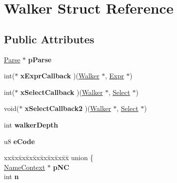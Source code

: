 \hypertarget{struct_walker}{}\section{Walker Struct Reference}
\label{struct_walker}
\subsection*{Public Attributes}
\begin{DoxyCompactItemize}
\item 
\mbox{\label{struct_walker_ac6e8e756b5da8f187b9cf6b94560f352}} 
\mbox{\hyperlink{struct_parse}{Parse}} $\ast$ {\bfseries p\+Parse}
\item 
\mbox{\label{struct_walker_a46cbdf0ccdcf736096a2f168218d28fe}} 
int($\ast$ {\bfseries x\+Expr\+Callback} )(\mbox{\hyperlink{struct_walker}{Walker}} $\ast$, \mbox{\hyperlink{struct_expr}{Expr}} $\ast$)
\item 
\mbox{\label{struct_walker_a76a2f8850bf1db17955fe85d65831cb0}} 
int($\ast$ {\bfseries x\+Select\+Callback} )(\mbox{\hyperlink{struct_walker}{Walker}} $\ast$, \mbox{\hyperlink{struct_select}{Select}} $\ast$)
\item 
\mbox{\label{struct_walker_ad35c57031847321ab3db9b7c0946b5e7}} 
void($\ast$ {\bfseries x\+Select\+Callback2} )(\mbox{\hyperlink{struct_walker}{Walker}} $\ast$, \mbox{\hyperlink{struct_select}{Select}} $\ast$)
\item 
\mbox{\label{struct_walker_a1183df46d2b0ecac73e76336067cf207}} 
int {\bfseries walker\+Depth}
\item 
\mbox{\label{struct_walker_a462e077f572efcae6a708f0640561807}} 
u8 {\bfseries e\+Code}
\item 
\mbox{\label{struct_walker_a65c0338d0a3a63ee73e8db8c8b3d5a49}} 
\begin{tabbing}
xx\=xx\=xx\=xx\=xx\=xx\=xx\=xx\=xx\=\kill
union \{\\
\>\mbox{\hyperlink{struct_name_context}{NameContext}} $\ast$ {\bfseries pNC}\\
\>int {\bfseries n}\\

\end{tabbing}
\end{DoxyCompactItemize}
